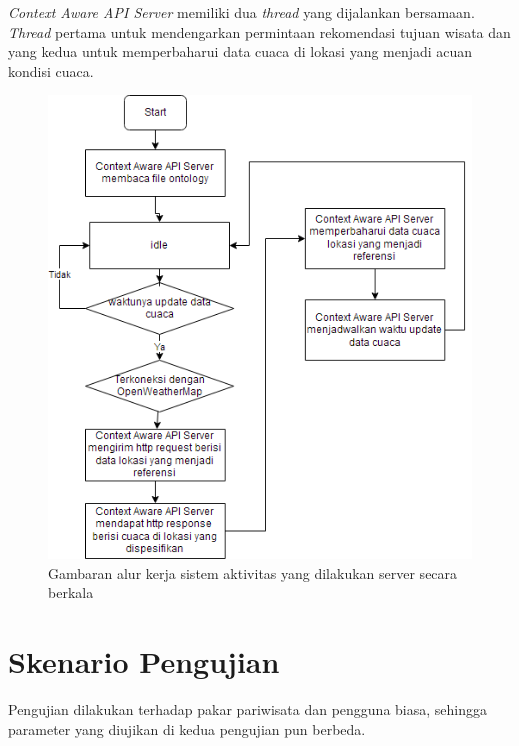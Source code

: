 \textit{Context Aware API Server} memiliki dua \textit{thread} yang dijalankan bersamaan. \textit{Thread} pertama untuk mendengarkan permintaan rekomendasi tujuan wisata dan yang kedua
untuk memperbaharui data cuaca di lokasi yang menjadi acuan kondisi cuaca.
\begin{figure}[h!]
    \centering
    \includegraphics[scale=0.6]{img/flowchart-general-2.png}
    \caption{Gambaran alur kerja sistem aktivitas yang dilakukan server secara berkala}
    \label{fig:flowchart2}
\end{figure}

\section{Skenario Pengujian}
Pengujian dilakukan terhadap pakar pariwisata dan pengguna biasa, sehingga parameter yang diujikan di kedua pengujian pun berbeda.

